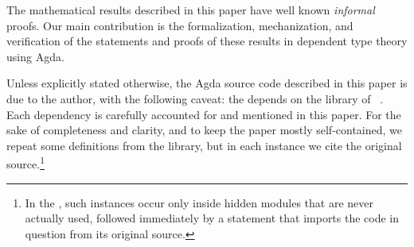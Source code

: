 The mathematical results described in this paper have well known \emph{informal} proofs. Our main contribution is the formalization, mechanization, and verification of the statements and proofs of these results in dependent type theory using Agda.

Unless explicitly stated otherwise, the Agda source code described in this paper is due to the author, with the following caveat: the \ualib depends on the \typetopology library of \MartinEscardo~\cite{MHE}.  Each dependency is carefully accounted for and mentioned in this paper. For the sake of completeness and clarity, and to keep the paper mostly self-contained, we repeat some definitions from the \typetopology library, but in each instance we cite the original source.\footnote{In the \ualib, such instances occur only inside hidden modules that are never actually used, followed immediately by a statement that imports the code in question from its original source.}
